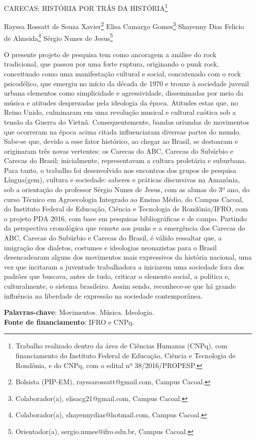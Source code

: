 \documentclass[article,12pt,onesidea,4paper,english,brazil]{abntex2}
\begin{document}
	
	
	\frenchspacing 
	
	\begin{center}
		\LARGE CARECAS: HISTÓRIA POR TRÁS DA HISTÓRIA\footnote{Trabalho realizado dentro da área de Ciências Humanas (CNPq), com financiamento do Instituto Federal de Educação, Ciência e Tecnologia de Rondônia, e do CNPq, com o edital nº 38/2016/PROPESP.}
		
		\normalsize
	Rayssa Rossatt de Souza Xavier\footnote{Bolsista (PIP-EM), rayssarossatt@gmail.com, Campus Cacoal.} 
	Elisa Camargo Gomes\footnote{Colaborador(a), elisacg21@gmail.com, Campus Cacoal.} 
		Shayenny Dias Felicio de Almeida\footnote{Colaborador(a), shayennydias@hotmail.com, Campus Cacoal.} 
		Sérgio Nunes de Jesus\footnote{Orientador(a), sergio.nunes@ifro.edu.br, Campus Cacoal.} 
	\end{center}
	
	\noindent O presente projeto de pesquisa tem como ancoragem a análise do rock tradicional, que passou por uma forte ruptura, originando o punk rock, conceituado como uma manifestação cultural e social, concatenado com o rock psicodélico, que emergiu no início da década de 1970 e trouxe à sociedade juvenil urbana elementos como simplicidade e agressividade, disseminadas por meio da música e atitudes desprezadas pela ideologia da época. Atitudes estas que, no Reino Unido, culminaram em uma revolução musical e cultural caótica sob a tensão da Guerra do Vietnã. Consequentemente, bandas oriundas de movimentos que ocorreram na época acima citada influenciaram diversas partes do mundo. Sabe-se que, devido a esse fator histórico, ao chegar ao Brasil, se destoaram e originaram três novas vertentes: os Carecas do ABC, Carecas do Subúrbio e Carecas do Brasil; inicialmente, representavam a cultura proletária e suburbana. Para tanto, o trabalho foi desenvolvido nos encontros dos grupos de pesquisa Língua(gem), cultura e sociedade: saberes e práticas discursivas na Amazônia, sob a orientação do professor Sérgio Nunes de Jesus, com as alunas do 3º ano, do curso Técnico em Agroecologia Integrado ao Ensino Médio, do Campus Cacoal, do Instituto Federal de Educação, Ciência e Tecnologia de Rondônia/IFRO, com o projeto PDA 2016, com base em pesquisas bibliográficas e de campo. Partindo da perspectiva cronológica que remete aos punks e a emergência dos Carecas do ABC, Carecas do Subúrbio e Carecas do Brasil, é válido ressaltar que, a imigração dos dialetos, costumes e ideologias neonazistas para o Brasil desencadearam alguns dos movimentos mais expressivos da história nacional, uma vez que incitaram a juventude trabalhadora a iniciarem uma sociedade fora dos padrões que buscava, antes de tudo, criticar o elemento social, a política e, culturalmente, o sistema brasileiro. Assim sendo, reconhece-se que há grande influência na liberdade de expressão na sociedade contemporânea.
	
	\vspace{\onelineskip}
	
	\noindent
	\textbf{Palavras-chave}: Movimentos. Música. Ideologia. \\
	\textbf{Fonte de financiamento}: IFRO e CNPq.
	
\end{document}
